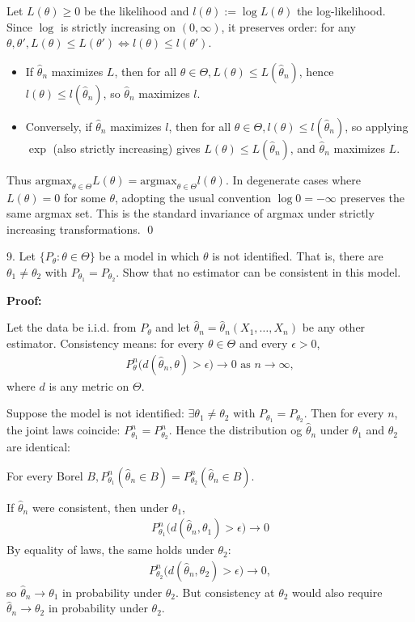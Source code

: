 \documentclass[10pt]{article}
\begin{document}
Let $L(\theta) \ge 0 $ be the likelihood and $l(\theta) := \log L(\theta)$ the log-likelihood. Since $\log $ is strictly increasing on $(0, \infty)$, it preserves order: for any $\theta, \theta', L(\theta) \le L(\theta') \iff l(\theta) \le l(\theta')$.
\begin{itemize}
    \item If $\hat{\theta}_n $ maximizes $L $, then for all $\theta \in\Theta, L(\theta) \le L(\hat{\theta}_n)$, hence $l(\theta) \le l(\hat{\theta}_n)$, so $\hat{\theta}_n $ maximizes $l $.
    \item Conversely, if $\hat{\theta}_n $ maximizes $l $, then for all $\theta\in\Theta, l(\theta) \le l(\hat{\theta}_n)$, so applying $\exp $ (also strictly increasing) gives $L(\theta) \le L(\hat{\theta}_n)$, and $\hat{\theta}_n $ maximizes $L $.
\end{itemize}
Thus $\text{argmax}_{\theta \in \Theta}L(\theta) = \text{argmax}_{\theta \in \Theta}l(\theta)$. In degenerate cases where $L(\theta) = 0 $ for some $\theta $, adopting the usual convention $\log 0 = -\infty $ preserves the same argmax set. This is the standard invariance of argmax under strictly increasing transformations. \qed

\hfill 

9. Let $\{P_\theta : \theta\in\Theta\}$ be a model in which $\theta $ is not identified. That is, there are $\theta_1 \neq\theta_2 $ with $P_{\theta_1} = P_{\theta_2}$. Show that no estimator can be consistent in this model.

\textbf{Proof:}

Let the data be i.i.d. from $P_\theta $ and let $\hat{\theta}_n = \hat{\theta}_n (X_1, …, X_n)$ be any other estimator. Consistency means: for every $\theta\in\Theta $ and every $\epsilon > 0 $,
\begin{gather*}
    P_\theta^n\big(d(\hat{\theta}_n, \theta) > \epsilon\big)\to 0 \text{ as } n\to\infty,
\end{gather*}
where $d $ is any metric on $\Theta $.

Suppose the model is not identified: $\exists\theta_1\neq\theta_2 $ with $P_{\theta_1} = P_{\theta_2}$. Then for every $n $, the joint laws coincide: $P_{\theta_1}^n = P_{\theta_2}^n $. Hence the distribution og $\hat{\theta}_n $ under $\theta_1 $ and $\theta_2 $ are identical:

For every Borel $B, P_{\theta_1}^n(\hat{\theta}_n\in B) = P_{\theta_2}^n(\hat{\theta}_n\in B)$.

If $\hat{\theta}_n $ were consistent, then under $\theta_1 $,
\begin{gather*}
    P_{\theta_1}^n\big(d(\hat{\theta}_n, \theta_1) > \epsilon\big)\to 0
\end{gather*}
By equality of laws, the same holds under $\theta_2 $:
\begin{gather*}
    P_{\theta_2}^n\big(d(\hat{\theta}_n, \theta_2) > \epsilon\big)\to 0,
\end{gather*}
so $\hat{\theta}_n \to \theta_1 $ in probability under $\theta_2 $. But consistency at $\theta_2 $ would also require $\hat{\theta}_n \to\theta_2 $ in probability under $\theta_2 $.
\end{document}
